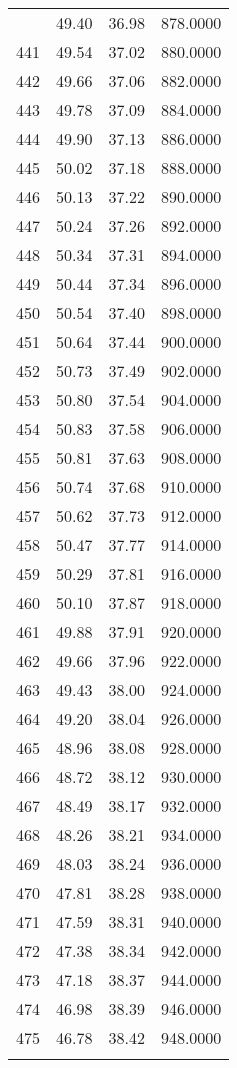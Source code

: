 \documentclass[
  captions=tableheading,
]{scrartcl}
\begin{document}
\begin{longtable} {l|l|l|l}
{440	& 49.40 &	36.98 &	878.0000\\
441	& 49.54 &	37.02 &	880.0000\\
442	& 49.66 &	37.06 &	882.0000\\
443	& 49.78 &	37.09 &	884.0000\\
444	& 49.90 &	37.13 &	886.0000\\
445	& 50.02 &	37.18 &	888.0000\\
446	& 50.13 &	37.22 &	890.0000\\
447	& 50.24 &	37.26 &	892.0000\\
448	& 50.34 &	37.31 &	894.0000\\
449	& 50.44 &	37.34 &	896.0000\\
450	& 50.54 &	37.40 &	898.0000\\
451	& 50.64 &	37.44 &	900.0000\\
452	& 50.73 &	37.49 &	902.0000\\
453	& 50.80 &	37.54 &	904.0000\\
454	& 50.83 &	37.58 &	906.0000\\
455	& 50.81 &	37.63 &	908.0000\\
456	& 50.74 &	37.68 &	910.0000\\
457	& 50.62 &	37.73 &	912.0000\\
458	& 50.47 &	37.77 &	914.0000\\
459	& 50.29 &	37.81 &	916.0000\\
460	& 50.10 &	37.87 &	918.0000\\
461	& 49.88 &	37.91 &	920.0000\\
462	& 49.66 &	37.96 &	922.0000\\
463	& 49.43 &	38.00 &	924.0000\\
464	& 49.20 &	38.04 &	926.0000\\
465	& 48.96 &	38.08 &	928.0000\\
466	& 48.72 &	38.12 &	930.0000\\
467	& 48.49 &	38.17 &	932.0000\\
468	& 48.26 &	38.21 &	934.0000\\
469	& 48.03 &	38.24 &	936.0000\\
470	& 47.81 &	38.28 &	938.0000\\
471	& 47.59 &	38.31 &	940.0000\\
472	& 47.38 &	38.34 &	942.0000\\
473	& 47.18 &	38.37 &	944.0000\\
474	& 46.98 &	38.39 &	946.0000\\
475	& 46.78 &	38.42 &	948.0000\\
}
\end{longtable}
\end{document}
